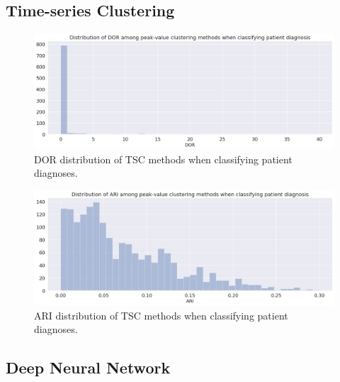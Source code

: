 \subsection{Time-series Clustering}

\begin{figure}[h!]
    \begin{center}
    \includegraphics[width=\textwidth]{results/tsc-ind-dor.png}
    \end{center}
    \caption{DOR distribution of TSC methods when classifying patient diagnoses.}
    \label{fig:tsc_ind_dor}
\end{figure}

\begin{figure}[h!]
    \begin{center}
    \includegraphics[width=\textwidth]{results/tsc-ind-ari.png}
    \end{center}
    \caption{ARI distribution of TSC methods when classifying patient diagnoses.}
    \label{fig:tsc_ind_ari}
\end{figure}

\subsection{Deep Neural Network}


